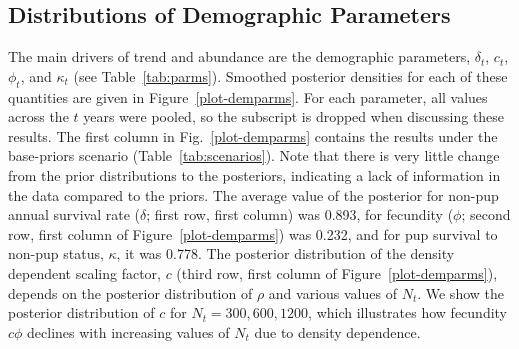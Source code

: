 \documentclass[]{risa}\usepackage[]{graphicx}\usepackage[]{color}
\begin{document}

\subsection{Distributions of Demographic Parameters}

The main drivers of trend and abundance are the demographic parameters, $\delta_t$, $c_t$, $\phi_t$, and $\kappa_t$ (see Table~\ref{tab:parms}). Smoothed posterior densities for each of these quantities are given in Figure~\ref{plot-demparms}. For each parameter, all values across the $t$ years were pooled, so the subscript is dropped when discussing these results. The first column in Fig.~\ref{plot-demparms} contains the results under the base-priors scenario (Table~\ref{tab:scenarios}). Note that there is very little change from the prior distributions to the posteriors, indicating a lack of information in the data compared to the priors.  The average value of the posterior for non-pup annual survival rate ($\delta$; first row, first column) was 0.893, for fecundity ($\phi$; second row, first column of Figure~\ref{plot-demparms}) was 0.232, and for pup survival to non-pup status, $\kappa$, it was 0.778. The posterior distribution of the density dependent scaling factor, $c$ (third row, first column of Figure~\ref{plot-demparms}), depends on the posterior distribution of $\rho$ and various values of $N_t$. We show the posterior distribution of $c$ for $N_t = 300, 600, 1200$, which illustrates how fecundity $c\phi$ declines with increasing values of $N_t$ due to density dependence.
\end{document}
